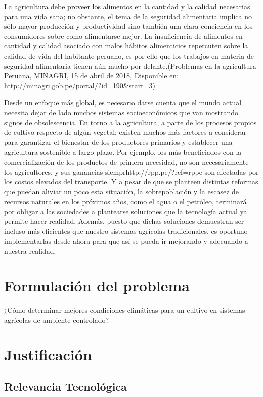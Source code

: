 \documentclass{report}
\begin{document}
La agricultura debe proveer los alimentos en la cantidad y la calidad necesarias
para una vida sana; no obstante, el tema de la seguridad alimentaria implica no
sólo mayor producción y productividad sino también una clara conciencia en los
consumidores sobre como alimentarse mejor. La insuficiencia de alimentos en
cantidad y calidad asociado con malos hábitos alimenticios repercuten sobre la
calidad de vida del habitante peruano, es por ello que los trabajos en materia
de seguridad alimentaria tienen aún mucho por delante.(Problemas en la
agricultura Peruana, MINAGRI, 15 de abril de 2018,  Disponible en:
http://minagri.gob.pe/portal/?id=190&start=3)

Desde un enfoque más global, es necesario darse cuenta que el mundo actual
necesita dejar de lado muchos sistemas socioeconómicos que van mostrando signos
de obsolescencia. En torno a la agricultura, a parte de los procesos propios de
cultivo respecto de algún vegetal; existen muchos más factores a considerar para
garantizar el bienestar de los productores primarios y establecer una
agricultura sostenible a largo plazo. Por ejemplo, los más beneficiados con la
comercialización de los productos de primera necesidad, no son necesariamente
los agricultores, y sus ganancias siemprhttp://rpp.pe/?ref=rppe son afectadas por los costos elevados
del transporte. Y a pesar de que se planteen distintas reformas que puedan
aliviar un poco esta situación, la sobrepoblación y la escasez de recursos
naturales en los próximos años, como el agua o el petróleo, terminará por
obligar a las sociedades a plantearse soluciones que la tecnología actual ya
permite hacer realidad. Además, puesto que dichas soluciones demuestran ser
incluso más eficientes que nuestro sistemas agrícolas tradicionales, es oportuno
implementarlas desde ahora para que así se pueda ir mejorando y adecuando a
nuestra realidad.
\section{Formulación del problema}
¿Cómo determinar mejores condiciones climáticas para un cultivo en sistemas
agrícolas de ambiente controlado?
\section{Justificación}
\subsection{Relevancia Tecnológica}
  
\end{document}
